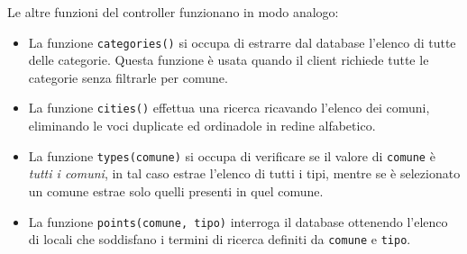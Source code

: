 Le altre funzioni del controller funzionano in modo analogo:
\begin{itemize} 

\item La funzione \texttt{categories()} 
si occupa di estrarre dal database l'elenco di tutte delle categorie. Questa funzione è usata quando il client richiede tutte le categorie senza filtrarle per comune.

\item La funzione \texttt{cities()} 
effettua una ricerca ricavando l'elenco dei comuni, eliminando le voci duplicate ed ordinadole in redine alfabetico.

\item La funzione \texttt{types(comune)} 
si occupa di verificare se il valore di \texttt{comune} è \emph{tutti i comuni}, in tal caso estrae l'elenco di tutti i tipi, mentre se è selezionato un comune estrae solo quelli presenti in quel comune.

\item La funzione \texttt{points(comune, tipo)} 
interroga il database ottenendo l'elenco di locali che soddisfano i termini di ricerca definiti da \texttt{comune} e \texttt{tipo}.
\end{itemize}




